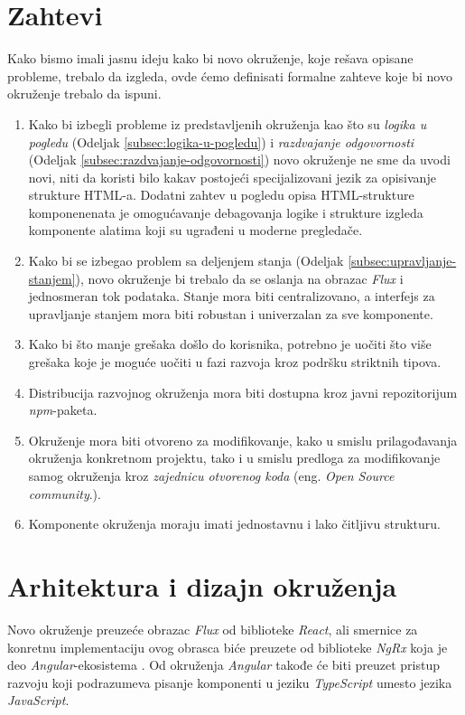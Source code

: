 \documentclass[12pt,oneside]{memoir}
\begin{document}
\section{Zahtevi}\label{sec:zahtevi}
Kako bismo imali jasnu ideju kako bi novo okruženje, koje rešava opisane probleme,
trebalo da izgleda, ovde ćemo definisati formalne zahteve koje bi novo
okruženje trebalo da ispuni.  
\begin{enumerate}
  \item Kako bi izbegli probleme iz predstavljenih okruženja kao što su
  \emph{logika u pogledu} (Odeljak \ref{subsec:logika-u-pogledu}) i
  \emph{razdvajanje odgovornosti} (Odeljak \ref{subsec:razdvajanje-odgovornosti})
  novo okruženje ne sme da uvodi novi, niti da koristi bilo kakav postojeći
  specijalizovani jezik za opisivanje strukture HTML-a. Dodatni zahtev u pogledu
  opisa HTML-strukture komponenenata je omogućavanje debagovanja
  logike i strukture izgleda komponente alatima koji su ugrađeni u moderne pregledače. \label{zahtev:1}
  \item 
  Kako bi se izbegao problem sa deljenjem stanja (Odeljak \ref{subsec:upravljanje-stanjem}),
  novo okruženje bi trebalo da
  se oslanja na obrazac \emph{Flux} i jednosmeran tok podataka.
  Stanje mora biti centralizovano, a interfejs za upravljanje stanjem
  mora biti robustan i univerzalan za sve komponente.
  \label{zahtev:2}
 \item Kako bi što manje grešaka došlo do korisnika, potrebno je uočiti
 što više grešaka koje je moguće uočiti u fazi razvoja kroz podršku striktnih tipova.
 \label{zahtev:3}
 \item Distribucija razvojnog okruženja mora biti dostupna kroz
 javni repozitorijum \emph{npm}-paketa. \label{zahtev:4}
 \item Okruženje mora biti otvoreno za modifikovanje, kako u smislu prilagođavanja okruženja konkretnom projektu,
tako i u smislu predloga za modifikovanje samog okruženja kroz \emph{zajednicu otvorenog koda} (eng. \emph{Open Source community}.). \label{zahtev:5}
 \item Komponente okruženja moraju imati jednostavnu i lako čitljivu strukturu. \label{zahtev:6}
\end{enumerate}

\section{Arhitektura i dizajn okruženja}
Novo okruženje preuzeće obrazac \emph{Flux} od biblioteke \emph{React}, ali smernice za konretnu implementaciju ovog obrasca
biće preuzete od biblioteke \emph{NgRx} koja je deo \emph{Angular}-ekosistema \cite{NgRx}. Od okruženja \emph{Angular}
takođe će biti preuzet pristup razvoju koji podrazumeva pisanje komponenti u jeziku \emph{TypeScript} umesto jezika \emph{JavaScript}.
\end{document}
